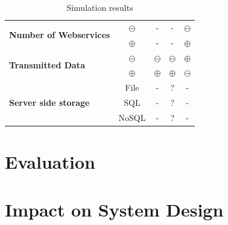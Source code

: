 \begin{table}[h]
\begin{tabular}{l|c|c|c|c}
\multirow{2}{*}{\textbf{Number of Webservices}}          & $\ominus$                                                           & -                                       & -                                                 & $\ominus$                                       \\ \cline{2-5} 
                                                         & $\oplus$                                                           & -                                       & -                                                 & $\oplus$                                       \\ \hline
\multirow{2}{*}{\textbf{Transmitted Data}}               & $\ominus$                                                           & $\ominus$                                       & $\ominus$                                                 & $\oplus$                                       \\ \cline{2-5} 
                                                         & $\oplus$                                                           & $\oplus$                                       & $\oplus$                                                 & $\ominus$                                       \\ \hline
\multirow{3}{*}{\textbf{Server side storage}}            & File                                                        & -                                       & ?                                                 & -                                       \\ \cline{2-5} 
                                                         & SQL                                                         & -                                       & ?                                                 & -                                       \\ \cline{2-5} 
                                                         & NoSQL                                                       & -                                       & ?                                                 & -                                       \\ \hline
\end{tabular}
\caption{Simulation results}
\label{tab:SimulationResults}
\end{table}

\section{Evaluation}

\section{Impact on System Design}